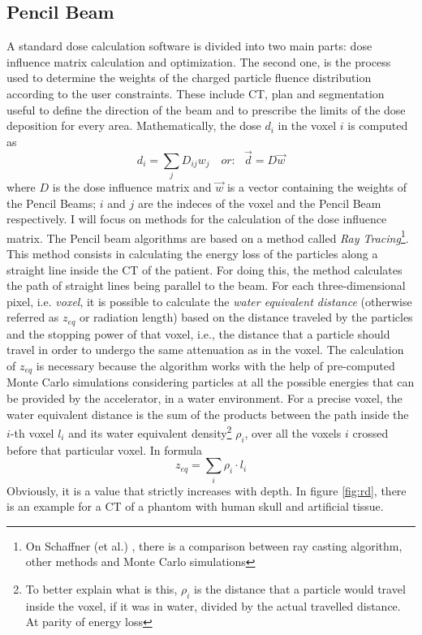 \documentclass[12pt, a4paper, twoside]{book}
\begin{document}
\subsection{Pencil Beam} 
\label{sec:pen}
A standard dose calculation software is divided into two main parts: dose influence matrix calculation and optimization. The second one, is the process used to determine the weights of the charged particle fluence distribution according to the user constraints. These include CT, plan and segmentation useful to define the direction of the beam and to prescribe the limits of the dose deposition for every area.
Mathematically, the dose $d_i$ in the voxel $i$ is computed as
\[
d_i = \sum_j D_{ij}w_j\,\,\,\,\,\,\textit{or:}\,\,\,\,\,\vec{d} = D\vec{w}
\]
where $D$ is the dose influence matrix and $\vec{w}$ is a vector containing the weights of the Pencil Beams; $i$ and $j$ are the indeces of the voxel and the Pencil Beam respectively.
I will focus on methods for the calculation of the dose influence matrix.
The Pencil beam algorithms are based on a method called \emph{Ray Tracing}\footnote{On Schaffner (et al.) \cite{schaf:pba}, there is a comparison between ray casting algorithm, other methods and Monte Carlo simulations}. This method consists in calculating the energy loss of the particles along a straight line inside the CT of the patient. For doing this, the method calculates the path of straight lines being parallel to the beam. For each three-dimensional pixel, i.e. \emph{voxel}, it is possible to calculate the \emph{water equivalent distance} (otherwise referred as $z_{eq}$ or radiation length) based on the distance traveled by the particles and the stopping power of that voxel, i.e., the distance that a particle should travel in order to undergo the same attenuation as in the voxel. The calculation of $z_{eq}$ is necessary because the algorithm works with the help of pre-computed Monte Carlo simulations considering particles at all the possible energies that can be provided by the accelerator, in a water environment. 
For a precise voxel, the water equivalent distance is the sum of the products between the path inside the $i$-th voxel $l_i$ and its water equivalent density\footnote{To better explain what is this, $\rho_i$ is the distance that a particle would travel inside the voxel, if it was in water, divided by the actual travelled distance. At parity of energy loss} $\rho_i$, over all the voxels $i$ crossed before that particular voxel.
In formula
\[
z_{eq} = \sum_{i} \rho_i\cdot l_i
\]
Obviously, it is a value that strictly increases with depth.
In figure \ref{fig:rd}, there is an example for a CT of a phantom with human skull and artificial tissue.
\end{document}
